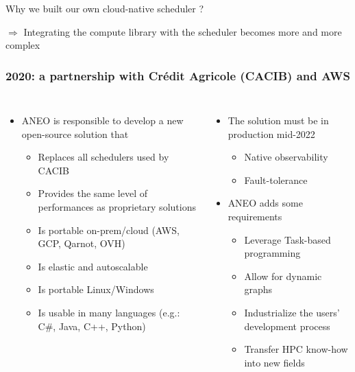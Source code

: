 \documentclass[10pt,aspectratio=1609]{beamer}
\begin{document}
\begin{section}{Why we built our own cloud-native scheduler ?}
\begin{frame}
    $\Rightarrow$ Integrating the compute library with the scheduler becomes more and more complex
  \end{frame}


  \begin{frame}
    \frametitle{2020: a partnership with Crédit Agricole (CACIB) and AWS}
    \begin{columns}
      \begin{itemize}
        \item ANEO is responsible to develop a new open-source solution that
        \begin{itemize}
          \item Replaces all schedulers used by CACIB
          \item Provides the same level of performances as proprietary solutions
          \item Is portable on-prem/cloud (AWS, GCP, Qarnot, OVH)
          \item Is elastic and autoscalable
          \item Is portable Linux/Windows
          \item Is usable in many languages (e.g.: C\#, Java, C++, Python)
        \end{itemize}
      \end{itemize}
      \begin{itemize}
        \item The solution must be in production mid-2022
        \begin{itemize}
          \item Native observability
          \item Fault-tolerance
        \end{itemize}
        \item ANEO adds some requirements
        \begin{itemize}
          \item Leverage Task-based programming
          \item Allow for dynamic graphs
          \item Industrialize the users' development process
          \item Transfer HPC know-how into new fields
        \end{itemize}
      \end{itemize}
    \end{columns}
  \end{frame}
  

\end{section}
\end{document}
